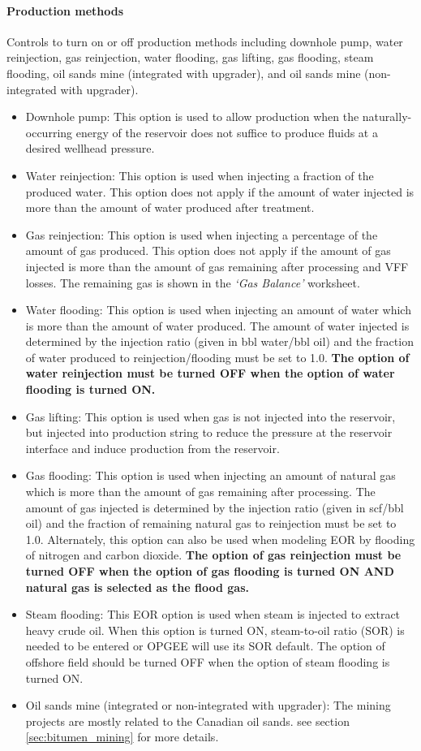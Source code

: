 \documentclass[11pt]{report}
\newcommand{\marg}[1]{{\footnotesize\textit{\textcolor{stanford}{'#1'}}}}
\newcommand{\marginnote}[1]{\marginpar{\marg{#1}}}
\newcommand{\sheet}[1]{\textit{`{#1}'}}
\begin{document}
\paragraph{Production methods} Controls to turn on or off production methods \marginnote{Inputs 1.1} including downhole pump, water reinjection, gas reinjection, water flooding, gas lifting, gas flooding, steam flooding, oil sands mine (integrated with upgrader), and oil sands mine (non-integrated with upgrader).
\begin{itemize}
\item Downhole pump: This option is used to allow production when the naturally-occurring energy of the reservoir does not suffice to produce fluids at a desired wellhead pressure.
\item Water reinjection: This option is used when injecting a fraction of the produced water. This option does not apply if the amount of water injected is more than the amount of water produced after treatment.
\item Gas reinjection: This option is used when injecting a percentage of the amount of gas produced. This option does not apply if the amount of gas injected is more than the amount of gas remaining after processing and VFF losses. The remaining gas is shown in the \sheet{Gas Balance} worksheet.
\item Water flooding: This option is used when injecting an amount of water which is more than the amount of water produced. The amount of water injected is determined by the injection ratio (given in bbl water/bbl oil) and the fraction of water produced to reinjection/flooding must be set to 1.0. \textbf{The option of water reinjection must be turned OFF when the option of water flooding is turned ON.} 
\item Gas lifting: This option is used when gas is not injected into the reservoir, but injected into production string to reduce the pressure at the reservoir interface and induce production from the reservoir.
\item Gas flooding: This option is used when injecting an amount of natural gas which is more than the amount of gas remaining after processing. The amount of gas injected is determined by the injection ratio (given in scf/bbl oil) and the fraction of remaining natural gas to reinjection must be set to 1.0. Alternately, this option can also be used when modeling EOR by flooding of nitrogen and carbon dioxide. \textbf{The option of gas reinjection must be turned OFF when the option of gas flooding is turned ON AND natural gas is selected as the flood gas.}
\item Steam flooding: This EOR option is used when steam is injected to extract heavy crude oil. When this option is turned ON, steam-to-oil ratio (SOR) is needed to be entered or OPGEE will use its SOR default. The option of offshore field should be turned OFF when the option of steam flooding is turned ON.
\item Oil sands mine (integrated or non-integrated with upgrader): The mining projects are mostly related to the Canadian oil sands. see section \,\ref{sec:bitumen_mining} for more details. 
 
\end{itemize}
\end{document}
